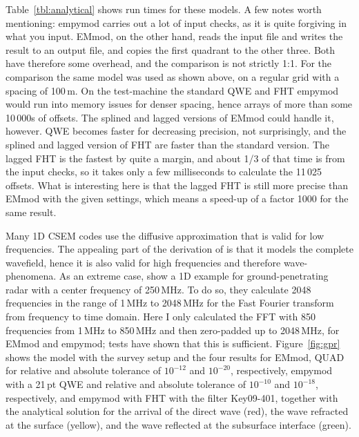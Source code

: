 \documentclass[manuscript,revised]{geophysics}
\begin{document}
Table~\ref{tbl:analytical} shows run times for these models. A few notes worth
mentioning: empymod carries out a lot of input checks, as it is quite forgiving
in what you input. EMmod, on the other hand, reads the input file and writes
the result to an output file, and copies the first quadrant to the other three.
Both have therefore some overhead, and the comparison is not strictly 1:1. For
the comparison the same model was used as shown above, on a regular grid with a
spacing of 100\,m. On the test-machine the standard QWE and FHT empymod would
run into memory issues for denser spacing, hence arrays of more than some
10\,000s of offsets. The splined and lagged versions of EMmod could handle it,
however.
%
%
QWE becomes faster for decreasing precision, not surprisingly, and the splined
and lagged version of FHT are faster than the standard version. The lagged FHT
is the fastest by quite a margin, and about 1/3 of that time is from the input
checks, so it takes only a few milliseconds to calculate the 11\,025 offsets.
What is interesting here is that the lagged FHT is still more precise than
EMmod with the given settings, which means a speed-up of a factor 1000 for the
same result.

Many 1D CSEM codes use the diffusive approximation that is valid for low
frequencies. The appealing part of the derivation of \cite{GEO.15.Hunziker} is
that it models the complete wavefield, hence it is also valid for high
frequencies and therefore wave-phenomena. As an extreme case,
\cite{GEO.15.Hunziker} show a 1D example for ground-penetrating radar with a
center frequency of 250\,MHz. To do so, they calculate 2048 frequencies in the
range of 1\,MHz to 2048\,MHz for the Fast Fourier transform from frequency to
time domain. Here I only calculated the FFT with 850 frequencies from 1\,MHz
to 850\,MHz and then zero-padded up to 2048\,MHz, for EMmod and empymod; tests
have shown that this is sufficient. Figure~\ref{fig:gpr} shows the model with
the survey setup and the four results for EMmod, QUAD for relative and absolute
tolerance of $10^{-12}$ and $10^{-20}$, respectively, empymod with a 21\,pt QWE
and relative and absolute tolerance of $10^{-10}$ and $10^{-18}$, respectively,
and empymod with FHT with the filter Key09-401, together with the analytical
solution for the arrival of the direct wave (red), the wave refracted at the
surface (yellow), and the wave reflected at the subsurface interface (green).
\end{document}
